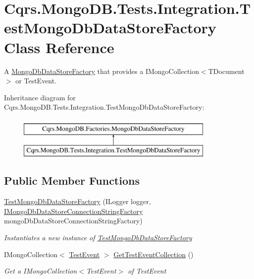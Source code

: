 \hypertarget{classCqrs_1_1MongoDB_1_1Tests_1_1Integration_1_1TestMongoDbDataStoreFactory}{}\section{Cqrs.\+Mongo\+D\+B.\+Tests.\+Integration.\+Test\+Mongo\+Db\+Data\+Store\+Factory Class Reference}
\label{classCqrs_1_1MongoDB_1_1Tests_1_1Integration_1_1TestMongoDbDataStoreFactory}


A \hyperlink{classCqrs_1_1MongoDB_1_1Factories_1_1MongoDbDataStoreFactory_a5306704647ba6dab35844231ca999b7e_a5306704647ba6dab35844231ca999b7e}{Mongo\+Db\+Data\+Store\+Factory} that provides a I\+Mongo\+Collection$<$\+T\+Document$>$ or Test\+Event.  


Inheritance diagram for Cqrs.\+Mongo\+D\+B.\+Tests.\+Integration.\+Test\+Mongo\+Db\+Data\+Store\+Factory\+:\begin{figure}[H]
\begin{center}
\leavevmode
\includegraphics[height=2.000000cm]{classCqrs_1_1MongoDB_1_1Tests_1_1Integration_1_1TestMongoDbDataStoreFactory}
\end{center}
\end{figure}
\subsection*{Public Member Functions}
\begin{DoxyCompactItemize}
\item 
\hyperlink{classCqrs_1_1MongoDB_1_1Tests_1_1Integration_1_1TestMongoDbDataStoreFactory_abb427efd7fcd28548fd02d09a2901994_abb427efd7fcd28548fd02d09a2901994}{Test\+Mongo\+Db\+Data\+Store\+Factory} (I\+Logger logger, \hyperlink{interfaceCqrs_1_1MongoDB_1_1Factories_1_1IMongoDbDataStoreConnectionStringFactory}{I\+Mongo\+Db\+Data\+Store\+Connection\+String\+Factory} mongo\+Db\+Data\+Store\+Connection\+String\+Factory)
\begin{DoxyCompactList}\small\item\em Instantiates a new instance of \hyperlink{classCqrs_1_1MongoDB_1_1Tests_1_1Integration_1_1TestMongoDbDataStoreFactory}{Test\+Mongo\+Db\+Data\+Store\+Factory} \end{DoxyCompactList}\item 
I\+Mongo\+Collection$<$ \hyperlink{classCqrs_1_1Azure_1_1ServiceBus_1_1Tests_1_1Unit_1_1TestEvent}{Test\+Event} $>$ \hyperlink{classCqrs_1_1MongoDB_1_1Tests_1_1Integration_1_1TestMongoDbDataStoreFactory_a65d996d53f32b1a40121052193b582fa_a65d996d53f32b1a40121052193b582fa}{Get\+Test\+Event\+Collection} ()
\begin{DoxyCompactList}\small\item\em Get a I\+Mongo\+Collection$<$\+Test\+Event$>$ of Test\+Event \end{DoxyCompactList}\end{DoxyCompactItemize}
